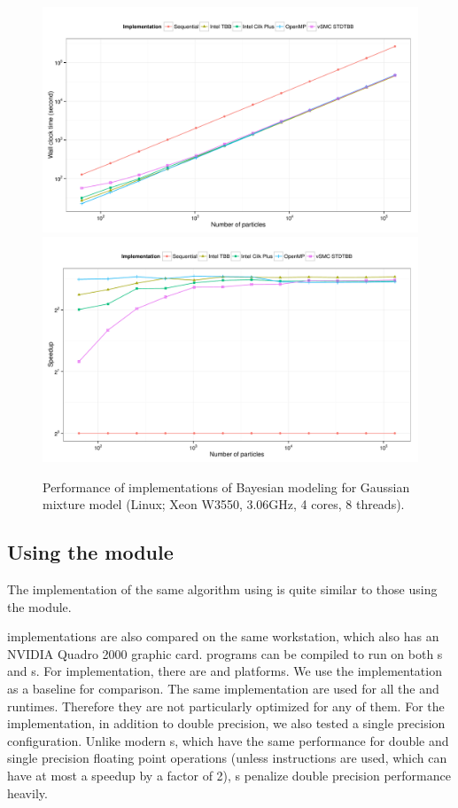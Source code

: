\begin{figure}
  \centering
  \includegraphics[width=\linewidth]{fig/bench-smp-time-running}
  \includegraphics[width=\linewidth]{fig/bench-smp-speedup-running}
  \caption{Performance of \cpp implementations of Bayesian modeling for
    Gaussian mixture model (Linux; Xeon W3550, 3.06GHz, 4 cores, 8 threads).}
  \label{fig:bench-smp-perf}
\end{figure}

\subsection{Using the \protect\opencl module}
\label{sub:Using the OpenCL module}

The implementation of the same algorithm using \opencl is quite similar to
those using the \smp module.

\opencl implementations are also compared on the same workstation, which also
has an NVIDIA Quadro 2000 graphic card. \opencl programs can be compiled to
run on both \cpu{}s and \gpu{}s. For \cpu implementation, there are \iocl and
\aocl platforms. We use the \tbb implementation as a baseline for comparison.
The same \opencl implementation are used for all the \cpu and \gpu runtimes.
Therefore they are not particularly optimized for any of them. For the \gpu
implementation, in addition to double precision, we also tested a single
precision configuration.  Unlike modern \cpu{}s, which have the same
performance for double and single precision floating point operations (unless
\simd instructions are used, which can have at most a speedup by a factor of
2), \gpu{}s penalize double precision performance heavily.

